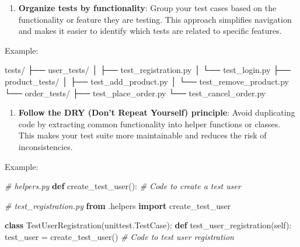 \documentclass[
  paper=a4,
  ,captions=tableheading
]{scrartcl}
\newenvironment{Shaded}{}{}
\newcommand{\CommentTok}[1]{\textcolor[rgb]{0.38,0.63,0.69}{\textit{#1}}}
\newcommand{\ImportTok}[1]{\textcolor[rgb]{0.00,0.50,0.00}{\textbf{#1}}}
\newcommand{\KeywordTok}[1]{\textcolor[rgb]{0.00,0.44,0.13}{\textbf{#1}}}
\newcommand{\NormalTok}[1]{#1}
\newcommand{\OperatorTok}[1]{\textcolor[rgb]{0.40,0.40,0.40}{#1}}
\newcommand{\VariableTok}[1]{\textcolor[rgb]{0.10,0.09,0.49}{#1}}
\providecommand{\tightlist}{%
  \setlength{\itemsep}{0pt}\setlength{\parskip}{0pt}}
\begin{document}
\begin{enumerate}
\def\labelenumi{\arabic{enumi}.}
\tightlist
\item
  \textbf{Organize tests by functionality}: Group your test cases based
  on the functionality or feature they are testing. This approach
  simplifies navigation and makes it easier to identify which tests are
  related to specific features.
\end{enumerate}

Example:

\begin{Shaded}
\begin{Highlighting}[]

\NormalTok{tests/}
\NormalTok{├── user\_tests/}
\NormalTok{│ ├── test\_registration.py}
\NormalTok{│ └── test\_login.py}
\NormalTok{├── product\_tests/}
\NormalTok{│ ├── test\_add\_product.py}
\NormalTok{│ └── test\_remove\_product.py}
\NormalTok{└── order\_tests/}
\NormalTok{├── test\_place\_order.py}
\NormalTok{└── test\_cancel\_order.py}
\end{Highlighting}
\end{Shaded}

\begin{enumerate}
\def\labelenumi{\arabic{enumi}.}
\setcounter{enumi}{1}
\tightlist
\item
  \textbf{Follow the DRY (Don't Repeat Yourself) principle}: Avoid
  duplicating code by extracting common functionality into helper
  functions or classes. This makes your test suite more maintainable and
  reduces the risk of inconsistencies.
\end{enumerate}

Example:

\begin{Shaded}
\begin{Highlighting}[]
\CommentTok{\# helpers.py}
\KeywordTok{def}\NormalTok{ create\_test\_user():}
    \CommentTok{\# Code to create a test user}

\CommentTok{\# test\_registration.py}
\ImportTok{from}\NormalTok{ .helpers }\ImportTok{import}\NormalTok{ create\_test\_user}

\KeywordTok{class}\NormalTok{ TestUserRegistration(unittest.TestCase):}
    \KeywordTok{def}\NormalTok{ test\_user\_registration(}\VariableTok{self}\NormalTok{):}
\NormalTok{        test\_user }\OperatorTok{=}\NormalTok{ create\_test\_user()}
        \CommentTok{\# Code to test user registration}
\end{Highlighting}
\end{Shaded}
\end{document}
